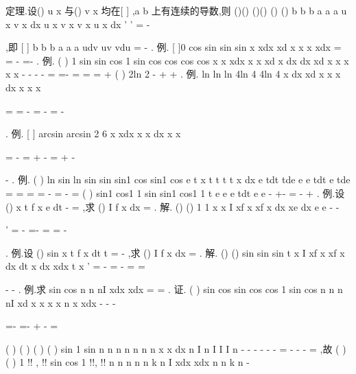 \textcolor{lyred}{定理}.设()
u x 与()
v x 均在[
]
,a b 上有连续的导数,则 
()()
()()
()
()
b
b
b
a
a
a
u x v x dx
u x v x
v x u
x dx
'
'
=
-




\int 
\int 
,即
[
]
b
b
b
a
a
a
udv
uv
vdu
=
-
\int 
\int 
. 
\textcolor{lyred}{例}.
[
]0
cos
sin
sin
sin
x
xdx
xd
x
x
x
xdx
\pi 
\pi 
\pi 
\pi 
=
=
-
=-
\int 
\int 
\int 
. 
\textcolor{lyred}{例}.
(
)
1 sin
sin
cos
1 sin
cos
cos
cos
cos
x
x
xdx
x
x
xd
x
dx
dx
xd
x
x
x
x
x
\pi 
\pi 
\pi 
\pi 
\pi 
\pi 
\pi 
-
-
-
-
=
=-
=
=
=
+
\int 
\int 
\int 
\int 
\int 
(
)
2ln
2 \pi 
-
+
+
. 
\textcolor{lyred}{例}.
ln
ln
ln
4ln 4
4ln 4
x dx
xd
x
x
x
dx
x
x
x




=
=
-
=
-
=
-




\int 
\int 
\int 
. 
\textcolor{lyred}{例}.
[
]
arcsin
arcsin
2 6
x
xdx
x
x
dx
x
x
\pi 
\pi 


=
-
=
\cdots 
+
-
=
+
-


-
\int 
\int 
. 
\textcolor{lyred}{例}.
(
)
ln
sin ln
sin
sin
sin1
cos
sin1
cos
e
t
x
t
t
t
t
x dx
e
tdt
tde
e
e
tdt
e
tde
=
=
=
=
-
=
-
=
\int 
\int 
\int 
\int 
\int 
(
)
sin1
cos1 1
sin
sin1
cos1 1
t
e
e
e
tdt
e
e
-
+-
=
-
+
\int 
. 
\textcolor{lyred}{例}.设
()
x
t
f x
e
dt
-
=\int 
,求
()
I
f x dx
=\int 
. 
解.
()
()
1 1
x
x
I
xf x
xf
x dx
xe
dx
e
e
-
-




'
=
-
=-
=
=
-












\int 
\int 
. 
\textcolor{lyred}{例}.设
()
sin
x
t
f x
dt
t
\pi 
=
-
\int 
,求
()
I
f x dx
\pi 
=\int 
. 
解.
()
()
sin
sin
sin
t
x
I
xf x
xf
x dx
dt
x
dx
xdx
t
x
\pi 
\pi 
\pi 
\pi 
\pi 
\pi \pi 
\pi 
'
=
-
=
-
=
=




-
-
\int 
\int 
\int 
\int 
. 
\textcolor{lyred}{例}.求
sin
cos
n
n
nI
xdx
xdx
\pi 
\pi 
=
=
\int 
\int 
. 
证.
(
)
sin
cos
sin
cos
cos
1 sin
cos
n
n
n
nI
xd
x
x
x
x
n
x
xdx
\pi 
\pi 
\pi 
-
-
-


=-
=-
+
\cdots 
-
=


\int 
\int 
(
)
(
)
(
)
(
)
sin
1 sin
n
n
n
n
n
n
n
x
x dx
n
I
n
I
I
I
n
\pi 
-
-
-
-
-
-
=
-
-
-
\Rightarrow 
=
\int 
,故 
(
)
(
)
1 !!
,
!!
sin
cos
1 !!,
!!
n
n
n
n
n
k
n
I
xdx
xdx
n
n
k
n
\pi 
\pi 
\pi 
-

